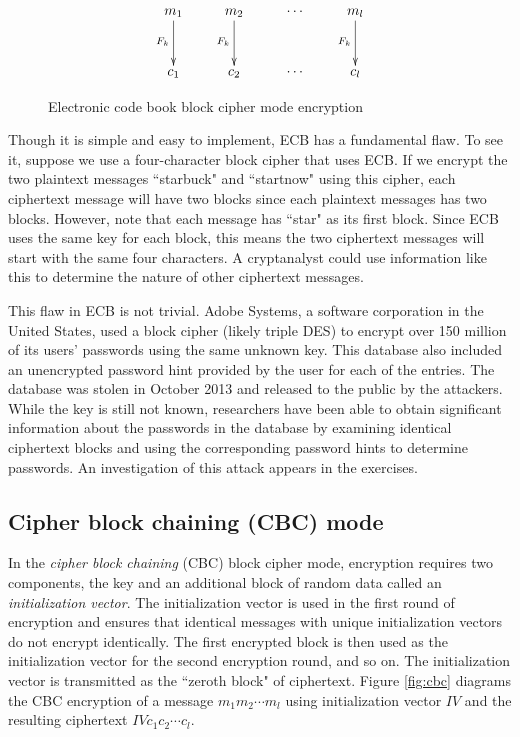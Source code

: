 \documentclass{book}
\theoremstyle{plain}
\theoremstyle{definition}
\begin{document}
\begin{figure}[h]
\begin{center}
$$\xymatrix@!{
m_1 \ar[d]_{F_k} & m_2 \ar[d]_{F_k} & \cdots & m_l \ar[d]_{F_k} \\
c_1 & c_2 & \cdots & c_l
}$$
\caption{Electronic code book block cipher mode encryption}
\label{fig:ecb}
\end{center}
\end{figure}

Though it is simple and easy to implement, ECB has a fundamental flaw. To see it, suppose we use a four-character block cipher that uses ECB. If we encrypt the two plaintext messages ``starbuck" and ``startnow" using this cipher, each ciphertext message will have two blocks since each plaintext messages has two blocks. However, note that each message has ``star" as its first block. Since ECB uses the same key for each block, this means the two ciphertext messages will start with the same four characters. A cryptanalyst could use information like this to determine the nature of other ciphertext messages.

This flaw in ECB is not trivial. Adobe Systems, a software corporation in the United States, used a block cipher (likely triple DES) to encrypt over 150 million of its users' passwords using the same unknown key. This database also included an unencrypted password hint provided by the user for each of the entries. The database was stolen in October 2013 and released to the public by the attackers. While the key is still not known, researchers have been able to obtain significant information about the passwords in the database by examining identical ciphertext blocks and using the corresponding password hints to determine passwords. An investigation of this attack appears in the exercises.

\subsection{Cipher block chaining (CBC) mode}
In the {\it cipher block chaining} (CBC) block cipher mode, encryption requires two components, the key and an additional block of random data called an {\it initialization vector}. The initialization vector is used in the first round of encryption and ensures that identical messages with unique initialization vectors do not encrypt identically. The first encrypted block is then used as the initialization vector for the second encryption round, and so on. The initialization vector is transmitted as the ``zeroth block" of ciphertext. Figure \ref{fig:cbc} diagrams the CBC encryption of a message $m_1m_2 \cdots m_l$ using initialization vector $IV$ and the resulting ciphertext $IVc_1c_2 \cdots c_l$.
\end{document}
